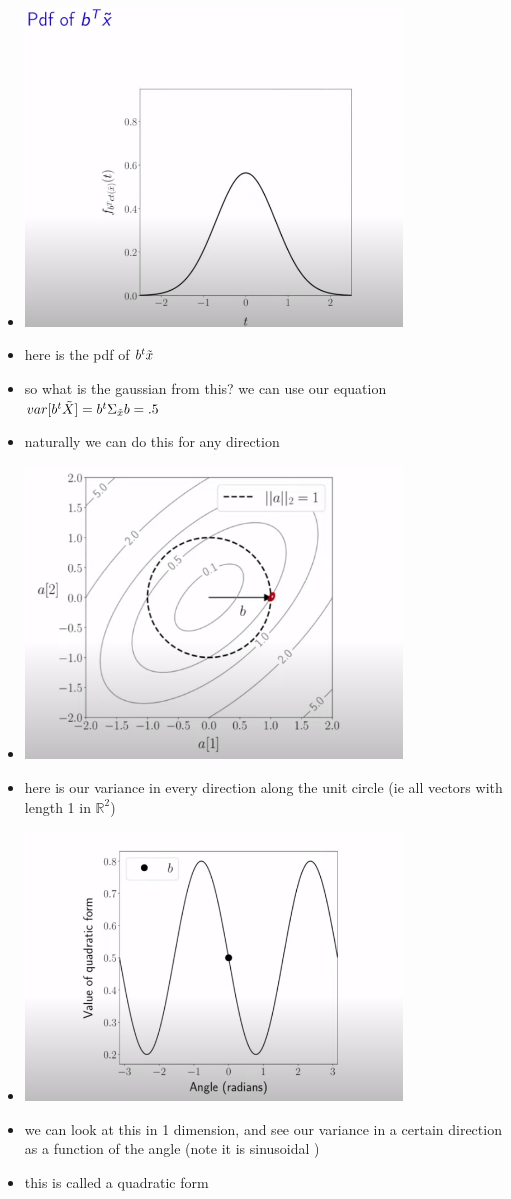 \documentclass{article}
\begin{document}
\begin{itemize}
\item \includegraphics[width=10cm]{notes/week_8/vedio_1/images/v1_4.png}
\item here is the pdf of $b^t\Tilde{x}$
\item so what is the gaussian from this? we can use our equation $var[b^t\Tilde{X}]=b^t\Sigma_{\Tilde{x}}b=.5$
\item naturally we can do this for any direction
\item \includegraphics[width=10cm]{notes/week_8/vedio_1/images/v1_5.png}
\item here is our variance in every direction along the unit circle (ie all vectors with length 1 in $\mathbb{R}^{2}$)
\item \includegraphics[width=10cm]{notes/week_8/vedio_1/images/v1_6.png}
\item we can look at this in 1 dimension, and see our variance in a certain direction as a function of the angle (note it is sinusoidal )
\item this is called a quadratic form 

\end{itemize}
\end{document}
